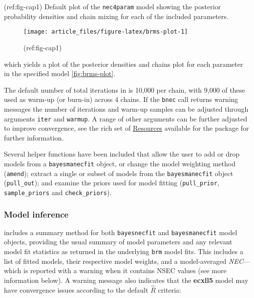 \documentclass[
]{jss}
\begin{document}
(ref:fig-cap1) Default  plot of the \texttt{nec4param} model
showing the posterior probability densities and chain mixing for each of
the included parameters.

\begin{CodeChunk}
\begin{figure}

{\centering \texttt{[image: article\_files/figure-latex/brms-plot-1]} 

}

\caption[(ref:fig-cap1)]{(ref:fig-cap1)}\label{fig:brms-plot}
\end{figure}
\end{CodeChunk}

which yields a plot of the posterior densities and chains plot for each
parameter in the specified model \autoref{fig:brms-plot}.

The default number of total iterations in  is 10,000 per
chain, with 9,000 of these used as warm-up (or burn-in) across 4 chains.
If the \texttt{bnec} call returns  warning messages the number
of iterations and warm-up samples can be adjusted through arguments
\texttt{iter} and \texttt{warmup}. A range of other arguments can be
further adjusted to improve convergence, see the rich set of
\href{https://github.com/paul-buerkner/brms}{Resources} available for
the  package for further information.

Several helper functions have been included that allow the user to add
or drop models from a \texttt{bayesmanecfit} object, or change the model
weighting method (\texttt{amend}); extract a single or subset of models
from the \texttt{bayesmanecfit} object (\texttt{pull\_out}); and examine
the priors used for model fitting (\texttt{pull\_prior},
\texttt{sample\_priors} and \texttt{check\_priors}).

\hypertarget{model-inference}{%
\subsubsection{Model inference}\label{model-inference}}

 includes a summary method for both \texttt{bayesnecfit}
and \texttt{bayesmanecfit} model objects, providing the usual summary of
model parameters and any relevant model fit statistics as returned in
the underlying \texttt{brm} model fits. This includes a list of fitted
models, their respective model weights, and a model-averaged
\emph{NEC}---which is reported with a warning when it contains NSEC
values (see more information below). A warning message also indicates
that the \textbf{ecxll5} model may have convergence issues according to
the default  \(\widehat{R}\) criteria:
\end{document}
